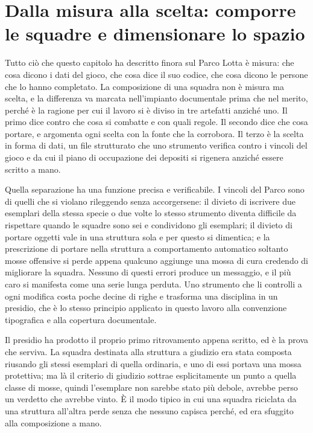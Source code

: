 \section{Dalla misura alla scelta: comporre le squadre e dimensionare lo spazio}

Tutto ciò che questo capitolo ha descritto finora sul Parco Lotta è misura: che cosa dicono i dati del gioco, che cosa dice il suo codice, che cosa dicono le persone che lo hanno completato. La composizione di una squadra non è misura ma scelta, e la differenza va marcata nell'impianto documentale prima che nel merito, perché è la ragione per cui il lavoro si è diviso in tre artefatti anziché uno. Il primo dice contro che cosa si combatte e con quali regole. Il secondo dice che cosa portare, e argomenta ogni scelta con la fonte che la corrobora. Il terzo è la scelta in forma di dati, un file strutturato che uno strumento verifica contro i vincoli del gioco e da cui il piano di occupazione dei depositi si rigenera anziché essere scritto a mano.

Quella separazione ha una funzione precisa e verificabile. I vincoli del Parco sono di quelli che si violano rileggendo senza accorgersene: il divieto di iscrivere due esemplari della stessa specie o due volte lo stesso strumento diventa difficile da rispettare quando le squadre sono sei e condividono gli esemplari; il divieto di portare oggetti vale in una struttura sola e per questo si dimentica; e la prescrizione di portare nella struttura a comportamento automatico soltanto mosse offensive si perde appena qualcuno aggiunge una mossa di cura credendo di migliorare la squadra. Nessuno di questi errori produce un messaggio, e il più caro si manifesta come una serie lunga perduta. Uno strumento che li controlli a ogni modifica costa poche decine di righe e trasforma una disciplina in un presidio, che è lo stesso principio applicato in questo lavoro alla convenzione tipografica e alla copertura documentale.

Il presidio ha prodotto il proprio primo ritrovamento appena scritto, ed è la prova che serviva. La squadra destinata alla struttura a giudizio era stata composta riusando gli stessi esemplari di quella ordinaria, e uno di essi portava una mossa protettiva; ma là il criterio di giudizio sottrae esplicitamente un punto a quella classe di mosse, quindi l'esemplare non sarebbe stato più debole, avrebbe perso un verdetto che avrebbe vinto. È il modo tipico in cui una squadra riciclata da una struttura all'altra perde senza che nessuno capisca perché, ed era sfuggito alla composizione a mano.

